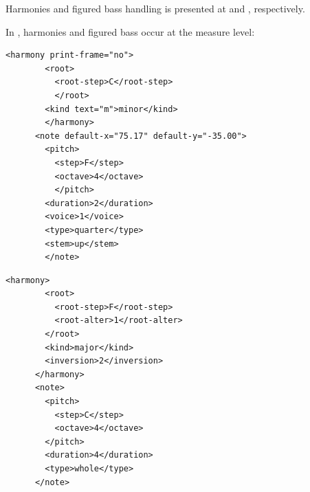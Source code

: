 Harmonies and figured bass handling is presented at  and , respectively.

In \mxml, harmonies and figured bass occur at the measure level:
\begin{lstlisting}[language=MusicXML]
      <harmony print-frame="no">
        <root>
          <root-step>C</root-step>
          </root>
        <kind text="m">minor</kind>
        </harmony>
      <note default-x="75.17" default-y="-35.00">
        <pitch>
          <step>F</step>
          <octave>4</octave>
          </pitch>
        <duration>2</duration>
        <voice>1</voice>
        <type>quarter</type>
        <stem>up</stem>
        </note>
\end{lstlisting}

\begin{lstlisting}[language=MusicXML]
      <harmony>
        <root>
          <root-step>F</root-step>
          <root-alter>1</root-alter>
        </root>
        <kind>major</kind>
        <inversion>2</inversion>
      </harmony>
      <note>
        <pitch>
          <step>C</step>
          <octave>4</octave>
        </pitch>
        <duration>4</duration>
        <type>whole</type>
      </note>
\end{lstlisting}

